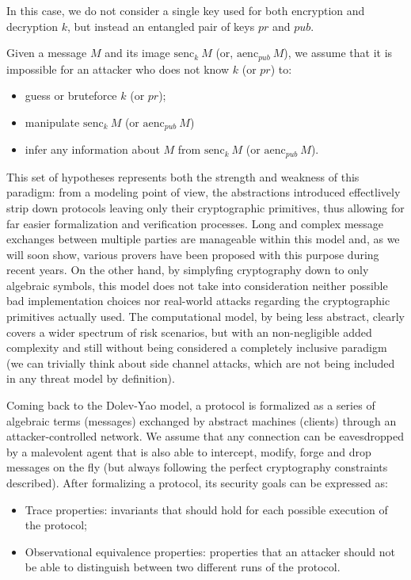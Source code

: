 \documentclass[fleqn,10pt]{SelfArx} %
\newcounter{definition}[section]\setcounter{definition}{0}
\begin{document}
In this case, we do not consider a single key used for both encryption and decryption $k$, but instead an entangled pair of keys $pr$ and $pub$.

Given a message $M$ and its image $\textrm{senc}_k\ M$ (or, $\textrm{aenc}_{pub}\ M$), we assume that it is impossible for an attacker who does not know $k$ (or $pr$) to:

\begin{itemize}
    \item guess or bruteforce $k$ (or $pr$);
    \item manipulate $\textrm{senc}_k\ M$ (or $\textrm{aenc}_{pub}\ M$)
    \item infer any information about $M$ from $\textrm{senc}_k\ M$ (or $\textrm{aenc}_{pub}\ M$).
\end{itemize}

This set of hypotheses represents both the strength and weakness of this paradigm: from a modeling point of view, the abstractions introduced effectlively strip down protocols leaving only their cryptographic primitives, thus allowing for far easier formalization and verification processes. Long and complex message exchanges between multiple parties are manageable within this model and, as we will soon show, various provers have been proposed with this purpose during recent years. On the other hand, by simplyfing cryptography down to only algebraic symbols, this model does not take into consideration neither possible bad implementation choices nor real-world attacks regarding the cryptographic primitives actually used. The computational model, by being less abstract, clearly covers a wider spectrum of risk scenarios, but with an non-negligible added complexity and still without being considered a completely inclusive paradigm (we can trivially think about side channel attacks, which are not being included in any threat model by definition).

Coming back to the Dolev-Yao model, a protocol is formalized as a series of algebraic terms (messages) exchanged by abstract machines (clients) through an attacker-controlled network. We assume that any connection can be eavesdropped by a malevolent agent that is also able to intercept, modify, forge and drop messages on the fly (but always following the perfect cryptography constraints described). After formalizing a protocol, its security goals can be expressed as:

\begin{itemize}
    \item Trace properties: invariants that should hold for each possible execution of the protocol;
    \item Observational equivalence properties: properties that an attacker should not be able to distinguish between two different runs of the protocol.
\end{itemize}
\end{document}
